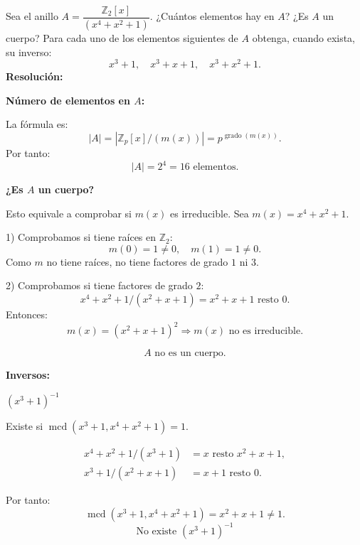 \documentclass[a4paper,12pt]{article}
\begin{document}
\begin{ejercicio}[title=Ejercicio 56]
Sea el anillo $A = \dfrac{\mathbb{Z}_2[x]}{(x^4 + x^2 + 1)}$.  
¿Cuántos elementos hay en $A$? ¿Es $A$ un cuerpo?
Para cada uno de los elementos siguientes de $A$ obtenga, cuando exista, su inverso:
\[
x^3 + 1, \quad x^3 + x + 1, \quad x^3 + x^2 + 1.
\]
\tcblower
\textbf{Resolución:}

\textbf{Número de elementos en $A$:}

La fórmula es:
\[
|A| = |\mathbb{Z}_p[x]/(m(x))| = p^{\operatorname{grado}(m(x))}.
\]
Por tanto:
\[
|A| = 2^4 = \boxed{16 \text{ elementos}}.
\]

\textbf{¿Es $A$ un cuerpo?}

Esto equivale a comprobar si $m(x)$ es irreducible.  
Sea $m(x) = x^4 + x^2 + 1$.

1) Comprobamos si tiene raíces en $\mathbb{Z}_2$:
\[
m(0) = 1 \neq 0, \quad m(1) = 1 \neq 0.
\]
Como $m$ no tiene raíces, no tiene factores de grado $1$ ni $3$.

2) Comprobamos si tiene factores de grado $2$:
\[
x^4 + x^2 + 1 / (x^2 + x + 1) = x^2 + x + 1 \text{ resto } 0.
\]
Entonces:
\[
m(x) = (x^2 + x + 1)^2 \Rightarrow m(x) \text{ no es irreducible.}
\]

\[
\boxed{A \text{ no es un cuerpo.}}
\]

\textbf{Inversos:}

\vspace{0.5em}

$(x^3 + 1)^{-1}$

Existe si $\operatorname{mcd}(x^3 + 1, x^4 + x^2 + 1) = 1$.

\[
\begin{aligned}
x^4 + x^2 + 1 / (x^3 + 1) &= x \text{ resto } x^2 + x + 1, \\
x^3 + 1 / (x^2 + x + 1) &= x + 1 \text{ resto } 0.
\end{aligned}
\]

Por tanto:
\[
\operatorname{mcd}(x^3 + 1, x^4 + x^2 + 1) = x^2 + x + 1 \neq 1.
\]
\[
\boxed{\text{No existe } (x^3 + 1)^{-1}}
\]

\end{ejercicio}
\end{document}
